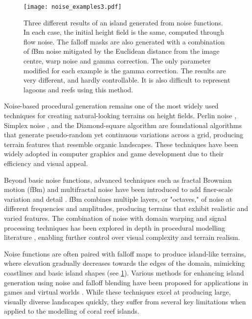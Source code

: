 \begin{figure}
    \texttt{[image: noise\_examples3.pdf]}
    \caption[Islands generation using fBm noise and falloff masks]{Three different results of an island generated from noise functions. In each case, the initial height field is the same, computed through flow noise. The falloff masks are also generated with a combination of fBm noise mitigated by the Euclidean distance from the image centre, warp noise and gamma correction. The only parameter modified for each example is the gamma correction. The results are very different, and hardly controllable. It is also difficult to represent lagoons and reefs using this method.}
    \label{fig:coral-island-noise-example}
\end{figure}

Noise-based procedural generation remains one of the most widely used techniques for creating natural-looking terrains on height fields. Perlin noise \cite{Perlin1985}, Simplex noise \cite{Perlin2001}, and the Diamond-square algorithm \cite{Fournier1982} are foundational algorithms that generate pseudo-random yet continuous variations across a grid, producing terrain features that resemble organic landscapes. These techniques have been widely adopted in computer graphics and game development due to their efficiency and visual appeal.

Beyond basic noise functions, advanced techniques such as fractal Brownian motion (fBm) and multifractal noise have been introduced to add finer-scale variation and detail \cite{Musgrave1989,Ebert2003}. fBm combines multiple layers, or "octaves," of noise at different frequencies and amplitudes, producing terrains that exhibit realistic and varied features. The combination of noise with domain warping and signal processing techniques has been explored in depth in procedural modelling literature \cite{Reinhard2010}, enabling further control over visual complexity and terrain realism.

Noise functions are often paired with falloff maps to produce island-like terrains, where elevation gradually decreases towards the edges of the domain, mimicking coastlines and basic island shapes (see \cref{fig:coral-island-noise-example}). Various methods for enhancing island generation using noise and falloff blending have been proposed for applications in games and virtual worlds \cite{Olsen2004}. While these techniques excel at producing large, visually diverse landscapes quickly, they suffer from several key limitations when applied to the modelling of coral reef islands.

